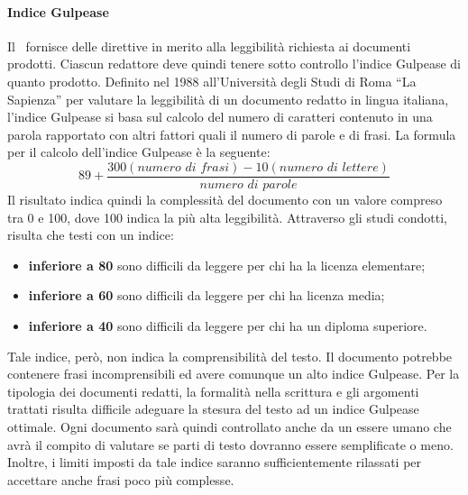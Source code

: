 \documentclass[../NormeDiProgetto.tex]{subfiles}
\begin{document}
					\paragraph{Indice Gulpease\\}
						Il \pianodiqualificav\ fornisce delle direttive in merito alla leggibilità richiesta ai documenti prodotti. Ciascun redattore deve quindi tenere sotto controllo l'indice Gulpease di quanto prodotto.
						Definito nel 1988 all'Università degli Studi di Roma ``La
						Sapienza'' per valutare la leggibilità di un documento redatto in
						lingua italiana, l'indice Gulpease si basa sul calcolo del
						numero di caratteri contenuto in una parola rapportato con altri
						fattori quali il numero di parole e di frasi.
						La formula per il calcolo dell'indice Gulpease è la seguente:
						\begin{equation*}
							89+\frac{300\left(\textit{numero di frasi}\right)-10\left(\textit{numero di lettere}\right)}{\textit{numero di parole}}
						\end{equation*}
						Il risultato indica	quindi la complessità del documento con un
						valore compreso tra 0 e 100, dove 100 indica la più alta
						leggibilità. Attraverso gli studi condotti,	risulta che testi con
						un indice:
						\begin{itemize}
							\item \textbf{inferiore a 80} sono difficili da leggere per chi
							ha la licenza elementare;
							\item \textbf{inferiore a 60} sono difficili da leggere per chi
							ha licenza media;
							\item \textbf{inferiore a 40} sono difficili da leggere per chi
							ha un diploma superiore.
						\end{itemize}
						Tale indice, però, non indica la comprensibilità del testo. Il
						documento potrebbe contenere frasi incomprensibili ed avere comunque
						un alto indice Gulpease. Per la tipologia dei documenti redatti, la
						formalità nella scrittura e gli argomenti trattati risulta difficile
						adeguare la stesura del testo ad un indice Gulpease ottimale. Ogni
						documento sarà quindi controllato anche da un essere umano
						che avrà il compito di valutare se parti di testo dovranno essere
						semplificate o meno. Inoltre, i limiti imposti da tale indice
						saranno sufficientemente rilassati per accettare anche frasi poco
						più complesse.
\end{document}

